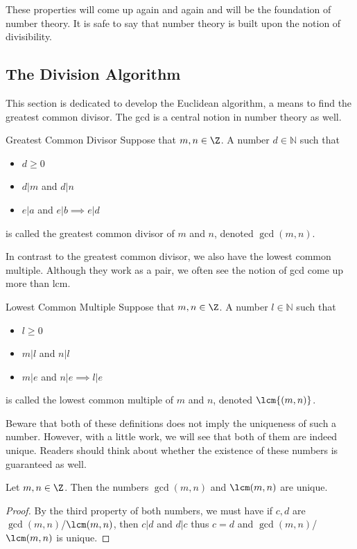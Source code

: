 \documentclass[a4paper]{article}
\begin{document}
These properties will come up again and again and will be the foundation of number theory. It is safe to say that number theory is built upon the notion of divisibility. 

\subsection{The Division Algorithm}
This section is dedicated to develop the Euclidean algorithm, a means to find the greatest common divisor. The gcd is a central notion in number theory as well. 
\begin{defn}{Greatest Common Divisor}{} Suppose that $m,n\in\Z$. A number $d\in\mathbb{N}$ such that 
\begin{itemize}
\item $d\geq 0$
\item $d|m$ and $d|n$
\item $e|a$ and $e|b\implies e|d$
\end{itemize}
is called the greatest common divisor of $m$ and $n$, denoted $\gcd{(m,n)}$.
\end{defn}

In contrast to the greatest common divisor, we also have the lowest common multiple. Although they work as a pair, we often see the notion of gcd come up more than lcm. 

\begin{defn}{Lowest Common Multiple}{} Suppose that $m,n\in\Z$. A number $l\in\mathbb{N}$ such that 
\begin{itemize}
\item $l\geq 0$
\item $m|l$ and $n|l$
\item $m|e$ and $n|e\implies l|e$
\end{itemize}
is called the lowest common multiple of $m$ and $n$, denoted $\lcm{(m,n)}$.
\end{defn}

Beware that both of these definitions does not imply the uniqueness of such a number. However, with a little work, we will see that both of them are indeed unique. Readers should think about whether the existence of these numbers is guaranteed as well. 

\begin{prp}{}{} Let $m,n\in\Z$. Then the numbers $\gcd(m,n)$ and $\lcm(m,n)$ are unique. 
\end{prp}
\begin{proof}
By the third property of both numbers, we must have if $c,d$ are $\gcd(m,n)$/$\lcm(m,n)$, then $c|d$ and $d|c$ thus $c=d$ and $\gcd(m,n)$/$\lcm(m,n)$ is unique. 
\end{proof}
\end{document}
